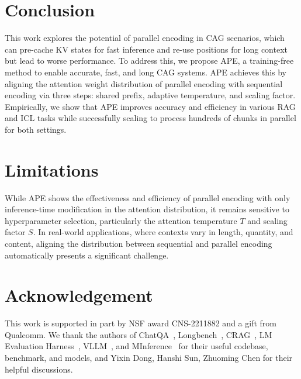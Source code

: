 \section{Conclusion}
\label{Conclusion}
This work explores the potential of parallel encoding in CAG scenarios, which can pre-cache KV states for fast inference and re-use positions for long context but lead to worse performance. To address this, we propose APE, a training-free method to enable accurate, fast, and long CAG systems. APE achieves this by aligning the attention weight distribution of parallel encoding with sequential encoding via three steps: shared prefix, adaptive temperature, and scaling factor. Empirically, we show that APE improves accuracy and efficiency in various RAG and ICL tasks while successfully scaling to process hundreds of chunks in parallel for both settings.

\section{Limitations}

While APE shows the effectiveness and efficiency of parallel encoding with only inference-time modification in the attention distribution, it remains sensitive to hyperparameter selection, particularly the attention temperature $T$ and scaling factor $S$. 
In real-world applications, where contexts vary in length, quantity, and content, aligning the distribution between sequential and parallel encoding automatically presents a significant challenge. 

\section{Acknowledgement}

This work is supported in part by NSF award CNS-2211882 and a gift from Qualcomm. We thank the authors of ChatQA~\citep{liu2024chatqa}, Longbench~\citep{bai2023longbench}, CRAG~\citep{yang2024crag}, LM Evaluation Harness~\citep{eval-harness}, VLLM~\citep{kwon2023efficient}, and MInference~\citep{jiang2024minference} for their useful codebase, benchmark, and models, and Yixin Dong, Hanshi Sun, Zhuoming Chen for their helpful discussions.

